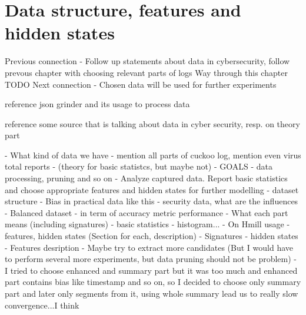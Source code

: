 \chapter{Data structure, features and hidden states}


Previous connection
- Follow up statements about data in cybersecurity, follow prevous chapter with choosing relevant parts of logs
Way through this chapter
TODO
Next connection
- Chosen data will be used for further experiments



reference json grinder and its usage to process data

reference some source that is talking about data in cyber security, resp. on theory part

- What kind of data we have - mention all parts of cuckoo log, mention even virus total reports
- (theory for basic statistcs, but maybe not)
- GOALS
  - data processing, pruning and so on
  - Analyze captured data. Report basic statistics and choose appropriate features and hidden states for further modelling
- dataset structure
  - Bias in practical data like this - security data, what are the influences
  - Balanced dataset - in term of accuracy metric performance
  - What each part means (including signatures)
- basic statistics - histogram...
- On Hmill usage - features, hidden states (Section for each, description)
- Signatures - hidden states
- Features  desription
- Maybe try to extract more candidates (But I would have to perform several more experiments, but data pruning should not be problem)
  - I tried to choose enhanced and summary part but it was too much and enhanced part contains bias like timestamp and so on, so I decided to choose only summary part and later only segments from it, using whole summary lead us to really slow convergence...I think
